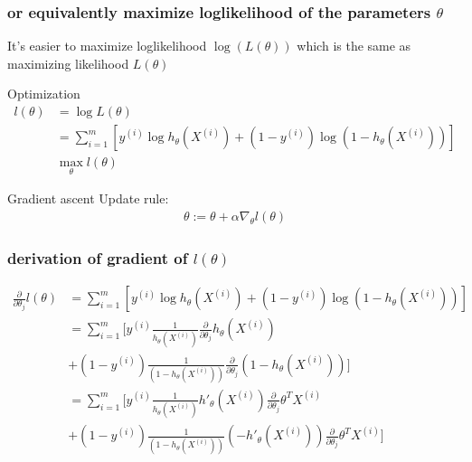 \documentclass[11pt]{beamer}
\begin{document}
\begin{frame}
	\frametitle{or equivalently maximize loglikelihood of the parameters $\theta$}
	It's easier to maximize loglikelihood $\log(L(\theta))$ which is the same as maximizing likelihood $L(\theta)$
		\begin{block}{Optimization}
		\begin{align*}
			l(\theta) &= \log{L(\theta)} \\
					 &= \sum_{i=1}^{m} [y^{(i)} \log{h_\theta(X^{(i)})} + (1-y^{(i)}) \log{(1-h_\theta(X^{(i)}))}] \\
			& \max_\theta l(\theta)
		\end{align*}
		\end{block}

		\begin{block}{Gradient ascent}
		Update rule:
		\begin{align*}
			\theta := \theta + \alpha \nabla_\theta l(\theta)
		\end{align*}
		\end{block}
\end{frame}

\begin{frame}
	\frametitle{derivation of gradient of $l(\theta)$}
	\begin{align*}
	\frac{\partial}{\partial \theta_j} l(\theta) &= \sum_{i=1}^{m} [y^{(i)} \log{h_\theta(X^{(i)})} + (1-y^{(i)}) \log{(1-h_\theta(X^{(i)}))}] \\
			&= \sum_{i=1}^{m} [y^{(i)} \frac{1}{h_\theta(X^{(i)})} \frac{\partial}{\partial \theta_j} h_\theta(X^{(i)}) \\
			&+ (1-y^{(i)}) \frac{1}{(1-h_\theta(X^{(i)}))} \frac{\partial}{\partial \theta_j} (1-h_\theta(X^{(i)})) ] \\
			&= \sum_{i=1}^{m} [y^{(i)} \frac{1}{h_\theta(X^{(i)})}  h'_\theta(X^{(i)}) \frac{\partial}{\partial \theta_j}\theta^T X^{(i)} \\
			&+ (1-y^{(i)}) \frac{1}{(1-h_\theta(X^{(i)}))}  (-h'_\theta(X^{(i)})) \frac{\partial}{\partial \theta_j} \theta^T X^{(i)} ]
	\end{align*}
\end{frame}
\end{document}
